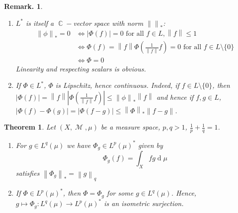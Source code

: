 \documentclass[12pt, a4paper]{memoir}
\DeclareMathOperator{\C}{{\mathbb{C}}}
\newcommand{\norm}[1]{\ensuremath{\left\lVert#1\right\rVert}} %
\newtheorem{theorem}{Theorem}[section]
\theoremstyle{nonumberplain}
\newtheorem{remark}{Remark.}
\DeclareMathOperator{\M}{\mathcal{M}}
\renewcommand{\d}[1]{\ensuremath{\operatorname{d}\!{#1}}} %
\begin{document}
\begin{remark}
    \begin{enumerate}
        \item $L^*$ is itself a $\C-$vector space with norm $\norm{}_*$:
            \begin{align*}
                \norm{\phi}_*=0 &\Leftrightarrow |\Phi(f)|=0\text{ for all $f\in L$}, \norm{f}\leq 1\\
                                &\Leftrightarrow \Phi(f)=\norm{f}\Phi\left(\frac{1}{\norm{f}}f\right)=0\text{ for all }f\in L\setminus\{0\}\\
                                &\Leftrightarrow \Phi=0
            \end{align*}
            Linearity and respecting scalars is obvious.
        \item If $\Phi\in L^*$, $\Phi$ is Lipschitz, hence continuous.
            Indeed, if $f\in L\setminus\{0\}$, then $|\Phi(f)|=\norm{f}\left\lvert\Phi\left(\frac{1}{\norm{f}}f\right)\right\rvert\leq\norm{\phi}_*\norm{f}$ and hence if $f,g\in L$, $|\Phi(f)-\Phi(g)|=|\Phi(f-g)|\leq\norm{\Phi}_*\norm{f-g}$.
    \end{enumerate}
\end{remark}
\begin{theorem}
    Let $(X,\M,\mu)$ be a measure space, $p,q>1$, $\frac{1}{p}+\frac{1}{q}=1$.
    \begin{enumerate}[nolistsep,label=(\roman*)]
        \item For $g\in L^q(\mu)$ we have $\Phi_g\in L^p(\mu)^*$ given by
            \begin{equation*}
                \Phi_g(f)=\int_X fg\d{\mu}
            \end{equation*}
            satisfies $\norm{\Phi_g}_*=\norm{g}_q$
        \item If $\Phi\in L^p(\mu)^*$, then $\Phi=\Phi_g$ for some $g\in L^q(\mu)$.
            Hence, $g\mapsto\Phi_g:L^q(\mu)\to L^p(\mu)^*$ is an isometric surjection.
    \end{enumerate}
\end{theorem}
\end{document}
